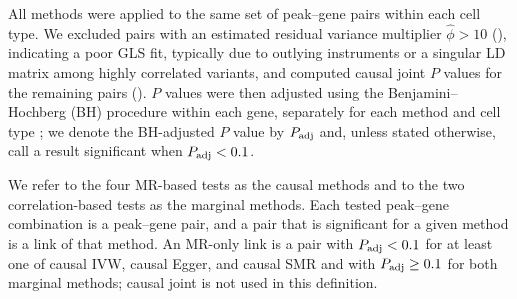 \noindent All methods were applied to the same set of peak--gene pairs within each cell type. We excluded pairs with an estimated residual variance multiplier $\hat{\phi}>10$ (), indicating a poor GLS fit, typically due to outlying instruments or a singular LD matrix among highly correlated variants, and computed causal joint $P$ values for the remaining pairs (). $P$ values were then adjusted using the Benjamini--Hochberg (BH) procedure within each gene, separately for each method and cell type \citep{benjamini1995fdr}; we denote the BH-adjusted $P$ value by $P_{\mathrm{adj}}$ and, unless stated otherwise, call a result significant when $P_{\mathrm{adj}}<0.1$.
\label{sec:filtering}

\noindent We refer to the four MR-based tests as the causal methods and to the two correlation-based tests as the marginal methods. Each tested peak--gene combination is a peak--gene pair, and a pair that is significant for a given method is a link of that method. An MR-only link is a pair with $P_{\mathrm{adj}}<0.1$ for at least one of causal IVW, causal Egger, and causal SMR and with $P_{\mathrm{adj}}\geq0.1$ for both marginal methods; causal joint is not used in this definition.
\label{sec:terminology}
